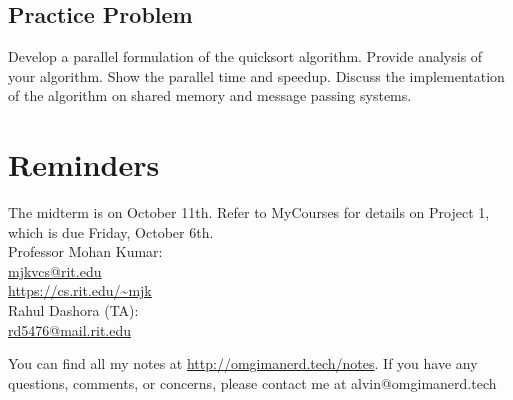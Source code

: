 \documentclass[letterpaper, 12pt]{math}
\begin{document}
\subsection*{Practice Problem}
Develop a parallel formulation of the quicksort algorithm. Provide analysis of
your algorithm. Show the parallel time and speedup. Discuss the implementation
of the algorithm on shared memory and message passing systems.

\section*{Reminders}
The midterm is on October 11th.
Refer to MyCourses for details on Project 1, which is due Friday,
October 6th. \\

\noindent Professor Mohan Kumar: \\
\url{mjkvcs@rit.edu} \\
\url{https://cs.rit.edu/~mjk} \\

\noindent Rahul Dashora (TA): \\
\url{rd5476@mail.rit.edu} \\

\begin{center}
  You can find all my notes at \url{http://omgimanerd.tech/notes}. If you have
  any questions, comments, or concerns, please contact me at
  alvin@omgimanerd.tech
\end{center}
\end{document}
